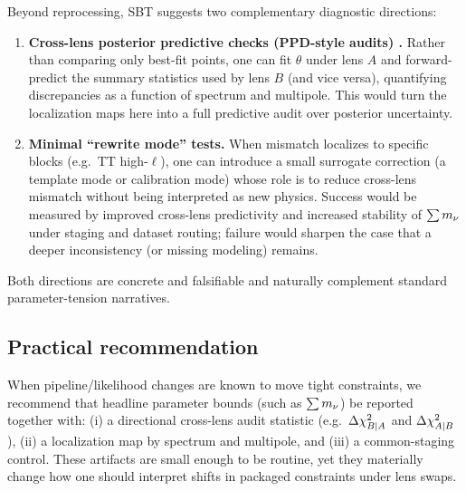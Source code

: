 Beyond reprocessing, SBT suggests two complementary diagnostic directions:
\begin{enumerate}[leftmargin=*, itemsep=2pt]
  \item \textbf{Cross-lens posterior predictive checks (PPD-style audits) \cite{gelman_meng_stern1996_ppc}.} Rather than comparing only best-fit points, one can fit $\theta$ under lens $A$ and forward-predict the summary statistics used by lens $B$ (and vice versa), quantifying discrepancies as a function of spectrum and multipole. This would turn the localization maps here into a full predictive audit over posterior uncertainty.
  \item \textbf{Minimal ``rewrite mode'' tests.} When mismatch localizes to specific blocks (e.g.\ TT high-$\ell$), one can introduce a small surrogate correction (a template mode or calibration mode) whose role is to reduce cross-lens mismatch without being interpreted as new physics. Success would be measured by improved cross-lens predictivity and increased stability of $\sum m_\nu$ under staging and dataset routing; failure would sharpen the case that a deeper inconsistency (or missing modeling) remains.
\end{enumerate}
Both directions are concrete and falsifiable and naturally complement standard parameter-tension narratives.

\subsection{Practical recommendation}
When pipeline/likelihood changes are known to move tight constraints, we recommend that headline parameter bounds (such as $\sum m_\nu$) be reported together with: (i) a directional cross-lens audit statistic (e.g.\ $\Delta \chi^2_{B|A}$ and $\Delta \chi^2_{A|B}$), (ii) a localization map by spectrum and multipole, and (iii) a common-staging control. These artifacts are small enough to be routine, yet they materially change how one should interpret shifts in packaged constraints under lens swaps.
